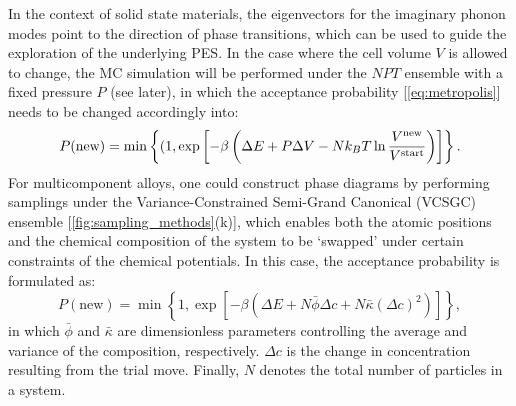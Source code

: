 In the context of solid state materials, the eigenvectors for the imaginary phonon modes point to the direction of phase transitions, which can be used to guide the exploration of the underlying PES.\cite{togo2013evolution,da2015phase}  In the case where the cell volume $V$ is allowed to change, the MC simulation will be performed under the $NPT$ ensemble with a fixed pressure $P$ (see later), in which the acceptance probability [\cref{eq:metropolis}] needs to be changed accordingly into:
\begin{equation*}
    P(\mbox{new})=\min\left\{(1,\exp\left[-\beta\left(\Delta E+P\Delta V-Nk_B T\ln \frac{V^{\mbox{\scriptsize{new}}}}{V^{\mbox{\scriptsize{start}}}} \right)\right]\right\}.
\end{equation*}
For multicomponent alloys, one could construct phase diagrams by performing samplings under the Variance-Constrained Semi-Grand Canonical (VCSGC) ensemble [\cref{fig:sampling_methods}(k)],\cite{aangqvist2019icet,sadigh2012scalable} which enables both the atomic positions and the chemical composition of the system to be `swapped' under certain constraints of the chemical potentials. In this case, the acceptance probability is formulated as:
\begin{equation*}
P(\mbox{new})=  \min\left\{1, \exp\left[-\beta \left( \Delta E + N \bar{\phi} \Delta c + N \bar{\kappa} (\Delta c)^2 \right) \right] \right\},
\end{equation*}
in which $\bar{\phi}$ and $\bar{\kappa}$ are dimensionless parameters controlling the average and variance of the composition, respectively. $\Delta c$ is the change in concentration resulting from the trial move. Finally, $N$ denotes the total number of particles in a system.
